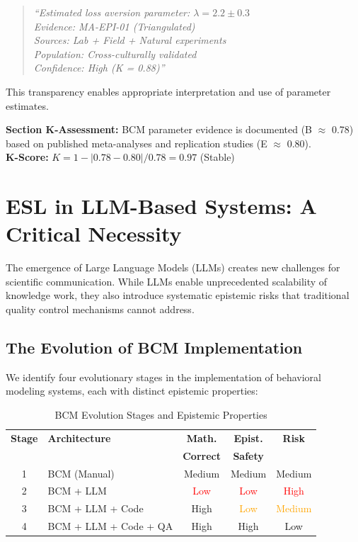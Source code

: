 \documentclass[11pt,a4paper]{article}
\begin{document}
\begin{quote}
\textit{``Estimated loss aversion parameter: $\lambda = 2.2 \pm 0.3$} \\
\textit{Evidence: MA-EPI-01 (Triangulated)} \\
\textit{Sources: Lab + Field + Natural experiments} \\
\textit{Population: Cross-culturally validated} \\
\textit{Confidence: High (K = 0.88)''}
\end{quote}

This transparency enables appropriate interpretation and use of parameter
estimates.

\begin{eslbox}
\textbf{Section K-Assessment:} BCM parameter evidence is documented
(B $\approx$ 0.78) based on published meta-analyses and replication
studies (E $\approx$ 0.80). \\
\textbf{K-Score:} $K = 1 - |0.78 - 0.80| / 0.78 = 0.97$ (Stable)
\end{eslbox}

\section{ESL in LLM-Based Systems: A Critical Necessity}

The emergence of Large Language Models (LLMs) creates new challenges
for scientific communication. While LLMs enable unprecedented scalability
of knowledge work, they also introduce systematic epistemic risks that
traditional quality control mechanisms cannot address.

\subsection{The Evolution of BCM Implementation}

We identify four evolutionary stages in the implementation of behavioral
modeling systems, each with distinct epistemic properties:

\begin{table}[h]
\centering
\caption{BCM Evolution Stages and Epistemic Properties}
\label{tab:evolution}
\begin{tabular}{clccc}
\toprule
\textbf{Stage} & \textbf{Architecture} & \textbf{Math.} & \textbf{Epist.} & \textbf{Risk} \\
 & & \textbf{Correct} & \textbf{Safety} & \\
\midrule
1 & BCM (Manual) & Medium & Medium & Medium \\
2 & BCM + LLM & \textcolor{red}{Low} & \textcolor{red}{Low} & \textcolor{red}{High} \\
3 & BCM + LLM + Code & High & \textcolor{orange}{Low} & \textcolor{orange}{Medium} \\
4 & BCM + LLM + Code + QA & High & High & Low \\
\bottomrule
\end{tabular}
\end{table}
\end{document}
